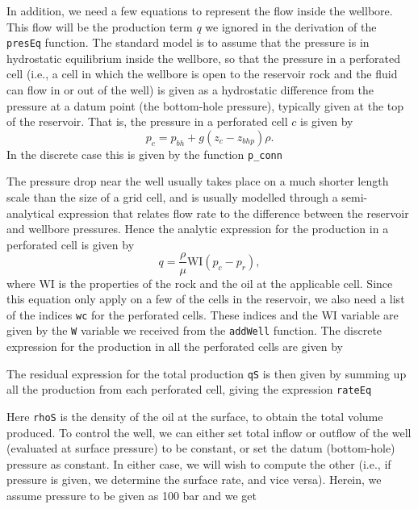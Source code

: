 In addition, we need a few equations to represent the flow inside the wellbore. This flow will be the production term $q$ we ignored in the derivation of the \texttt{presEq} function. The standard model is to assume that the pressure is in hydrostatic equilibrium inside the wellbore, so that the pressure in a perforated cell (i.e., a cell in which the wellbore is open to the reservoir rock and the fluid can flow in or out of the well) is given as a hydrostatic difference from the pressure at a datum point (the bottom-hole pressure), typically given at the top of the reservoir. That is, the pressure in a perforated cell $c$ is given by
\begin{equation*}
p_c = p_{bh} + g (z_c - z_{bhp})\rho.    
\end{equation*}
In the discrete case this is given by the function \texttt{p\_conn}

The pressure drop near the well usually takes place on a much shorter length scale than the size of a grid cell, and is usually modelled through a semi-analytical expression that relates flow rate to the difference between the reservoir and wellbore pressures. Hence the analytic expression for the production in a perforated cell is given by
\begin{equation*}
    q = \frac{\rho}{\mu}\mbox{WI}(p_c - p_r),
\end{equation*}
where \mbox{WI} is the properties of the rock and the oil at the applicable cell. Since this equation only apply on a few of the cells in the reservoir, we also need a list of the indices \texttt{wc} for the perforated cells. These indices and the \mbox{WI} variable are given by the \texttt{W} variable we received from the \texttt{addWell} function. The discrete expression for the production in all the perforated cells are given by

The residual expression for the total production \texttt{qS} is then given by summing up all the production from each perforated cell, giving the expression \texttt{rateEq}

Here \texttt{rhoS} is the density of the oil at the surface, to obtain the total volume produced. To control the well, we can either set total inflow or outflow of the well (evaluated at surface pressure) to be constant, or set the datum (bottom-hole) pressure as constant. In either case, we will wish to compute the other (i.e., if pressure is given, we determine the surface rate, and vice versa). Herein, we assume pressure to be given as 100 bar and we get

